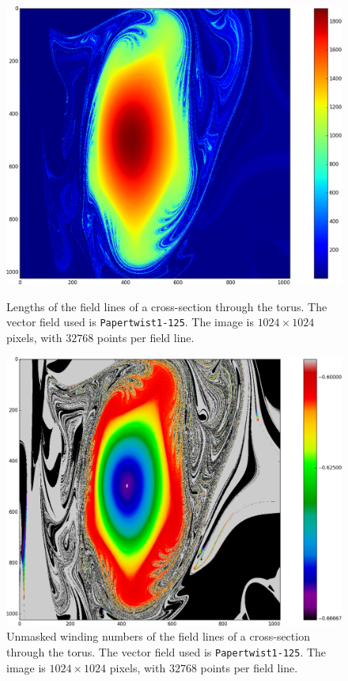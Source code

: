 \documentclass{article}
\begin{document}
\begin{figure}[!hb]
  \includegraphics[width=\linewidth]{Figures/Rings_Papertwist_twist1_125_lengths_steps32k.png}
	\caption{Lengths of the field lines of a cross-section through the torus. The vector field used is \texttt{Papertwist1-125}. The image is $1024\times 1024$ pixels, with $32768$ points per field line.}\label{fig:125-lengths}
\endminipage\hfill
{}
  \includegraphics[width=\linewidth]{Figures/Rings_Papertwist_twist1_125_nomask_steps32k.png}
	\caption{Unmasked winding numbers of the field lines of a cross-section through the torus. The vector field used is \texttt{Papertwist1-125}. The image is $1024\times 1024$ pixels, with $32768$ points per field line.}\label{fig:125-unmasked}

\end{figure}
\end{document}
